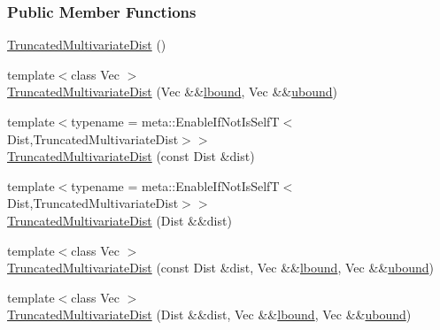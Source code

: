 \subsubsection*{Public Member Functions}
\begin{DoxyCompactItemize}
\item 
\hyperlink{classprior__hessian_1_1TruncatedMultivariateDist_a2a33c3ab2f0101fa7ad6a0c87e199866}{Truncated\+Multivariate\+Dist} ()
\item 
{\footnotesize template$<$class Vec $>$ }\\\hyperlink{classprior__hessian_1_1TruncatedMultivariateDist_af52410cda1691a8fdd79ff931ab8c95f}{Truncated\+Multivariate\+Dist} (Vec \&\&\hyperlink{classprior__hessian_1_1TruncatedMultivariateDist_ab66c6542efa3e4c4b302c3412def22da}{lbound}, Vec \&\&\hyperlink{classprior__hessian_1_1TruncatedMultivariateDist_a9ac92816ee8fb9c9c0c174e961bbfc81}{ubound})
\item 
{\footnotesize template$<$typename  = meta\+::\+Enable\+If\+Not\+Is\+Self\+T$<$\+Dist,\+Truncated\+Multivariate\+Dist$>$$>$ }\\\hyperlink{classprior__hessian_1_1TruncatedMultivariateDist_a5d237400b3d2db0109f060a6ed402c5e}{Truncated\+Multivariate\+Dist} (const Dist \&dist)
\item 
{\footnotesize template$<$typename  = meta\+::\+Enable\+If\+Not\+Is\+Self\+T$<$\+Dist,\+Truncated\+Multivariate\+Dist$>$$>$ }\\\hyperlink{classprior__hessian_1_1TruncatedMultivariateDist_aa9d83001bbbb5387a548abade51378d6}{Truncated\+Multivariate\+Dist} (Dist \&\&dist)
\item 
{\footnotesize template$<$class Vec $>$ }\\\hyperlink{classprior__hessian_1_1TruncatedMultivariateDist_acf068c2620e520a54f46595ef08c95a4}{Truncated\+Multivariate\+Dist} (const Dist \&dist, Vec \&\&\hyperlink{classprior__hessian_1_1TruncatedMultivariateDist_ab66c6542efa3e4c4b302c3412def22da}{lbound}, Vec \&\&\hyperlink{classprior__hessian_1_1TruncatedMultivariateDist_a9ac92816ee8fb9c9c0c174e961bbfc81}{ubound})
\item 
{\footnotesize template$<$class Vec $>$ }\\\hyperlink{classprior__hessian_1_1TruncatedMultivariateDist_ad2f1220027c8c9514ae38324ce60db2d}{Truncated\+Multivariate\+Dist} (Dist \&\&dist, Vec \&\&\hyperlink{classprior__hessian_1_1TruncatedMultivariateDist_ab66c6542efa3e4c4b302c3412def22da}{lbound}, Vec \&\&\hyperlink{classprior__hessian_1_1TruncatedMultivariateDist_a9ac92816ee8fb9c9c0c174e961bbfc81}{ubound})

\end{DoxyCompactItemize}
